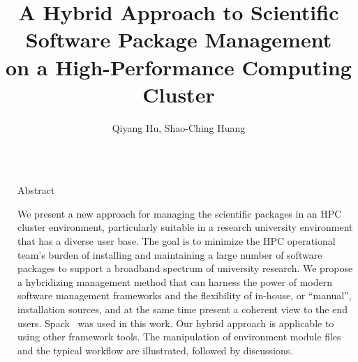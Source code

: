 \documentclass[final]{beamer}
\title{A Hybrid Approach to Scientific Software Package Management \\ on a High-Performance Computing Cluster} %
\author{Qiyang Hu, Shao-Ching Huang} %
\institute{Institute for Digital Research and Education, University of California, Los Angeles (UCLA)} %
\newlength{\sepwid}
\newlength{\onecolwid}
\begin{document}

\setlength{\belowcaptionskip}{2ex} %
\setlength\belowdisplayshortskip{2ex} %

\begin{frame}[t] %

\begin{columns}[t] %

\begin{column}{\sepwid}\end{column} %

\begin{column}{\onecolwid} %


\begin{alertblock}{Abstract}

We present a new approach for managing the scientific packages in an HPC cluster environment, particularly suitable in a research university environment that has a diverse user base.
The goal is to minimize the HPC operational team's burden of installing and maintaining a large number of software packages to support a broadband spectrum of university research.
We propose a hybridizing management method that can harness the power of modern software management frameworks and the flexibility of in-house, or ``manual'', installation sources, and at the same time present a coherent view to the end users. Spack~\cite{gamblin:15} was used in this work. Our hybrid approach is applicable to using other framework tools. The manipulation of environment module files and the typical workflow are illustrated, followed by discussions.


\end{alertblock}



\end{column}
\end{columns}
\end{frame}
\end{document}

